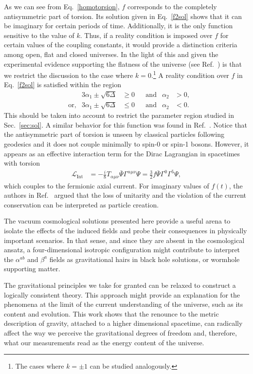 \documentclass[aps,prd,12pt,superscriptaddress,showpacs,showkeys,reprint,nofootinbib]{revtex4-1}
\begin{document}
As we can see from Eq.~\eqref{homotorsion}, $f$ corresponds to the completely antisymmetric part of torsion. Its solution given in Eq.~\eqref{f2sol} shows that it can be imaginary for certain periods of time. Additionally, it is the only function sensitive to the value of $k$. Thus, if a reality condition is imposed over $f$ for certain values of the coupling constants, it would provide a distinction criteria among open, flat and closed universes. In the light of this and given the experimental evidence supporting the flatness of the universe (see Ref.~\cite{Spergel:2006hy}) is that we restrict the discussion to the case where $k=0$.\footnote{The cases where $k = \pm1$ can be studied analogously.} A reality condition over $f$ in Eq.~\eqref{f2sol} is satisfied within the region 
\begin{align*}
 & & 3\alpha_1 \pm \sqrt{6\Delta} &\geq 0 & &\mbox{and}& \alpha_2 &>0, \\
 & \mbox{or,} & 3\alpha_1 \pm \sqrt{6\Delta} &\leq 0 & &\mbox{and}& \alpha_2&<0.
\end{align*}
This should be taken into account to restrict the parameter region studied in Sec.~\ref{sec:sol}.  
A similar behavior for this function was found in Ref.~\cite{Toloza:2013wi}. Notice that the antisymmetric part of torsion is unseen by classical particles following geodesics and it does not couple minimally to spin-0 or spin-1 bosons. However, it appears as an effective interaction term for the Dirac Lagrangian in spacetimes with torsion~\cite{Hehl:1976kj}
\begin{align*}
  \mathcal{L}_{\text{Int}}&=-\frac{i}{8}T_{\alpha\mu\nu}\bar{\Psi}\Gamma^{\alpha\mu\nu}\Psi =\frac{3}{2}f\bar{\Psi}\Gamma^0\Gamma^5\Psi,
\end{align*}
which couples to the fermionic axial current. For imaginary values of $f(t)$, the authors in Ref.~\cite{Toloza:2013wi} argued that the loss of unitarity and the violation of the current conservation can be interpreted as particle creation. 

The vacuum cosmological solutions presented here provide a useful arena to isolate the effects of the induced fields and probe their consequences in physically important scenarios. In that sense, and since they are absent in the cosmological ansatz, a four-dimensional isotropic configuration might contribute to interpret the $\alpha^{ab}$ and $\beta^a$ fields as gravitational hairs in black hole solutions, or wormhole supporting matter. 

The gravitational principles we take for granted can be relaxed to construct a logically consistent theory. This approach might provide an explanation for the phenomena at the limit of the current understanding of the universe, such as its content and evolution. This work shows that the renounce to the metric description of gravity, attached to a higher dimensional spacetime, can radically affect the way we perceive the gravitational degrees of freedom and, therefore, what our measurements read as the energy content of the universe. 
\end{document}
